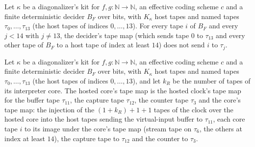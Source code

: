 \begin{theorem}
\label{Turing.NTimeDiag.DzKit.bB_ne}
\leanok
{}
Let $\kappa$ be a diagonalizer's kit for $f, g : \mathbb{N} \to \mathbb{N}$, an effective coding scheme $c$ and a finite deterministic decider $B_F$ over bits, with $K_\kappa$ host tapes and named tapes $\tau_0, \dots, \tau_{13}$ (the host tapes of indices $0, \dots, 13$). For every tape $i$ of $B_F$ and every $j < 14$ with $j \ne 13$, the decider's tape map (which sends tape $0$ to $\tau_{13}$ and every other tape of $B_F$ to a host tape of index at least $14$) does not send $i$ to $\tau_j$.
\end{theorem}

\begin{definition}
\label{Turing.NTimeDiag.DzKit.sR}
\leanok
{}
Let $\kappa$ be a diagonalizer's kit for $f, g : \mathbb{N} \to \mathbb{N}$, an effective coding scheme $c$ and a finite deterministic decider $B_F$ over bits, with $K_\kappa$ host tapes and named tapes $\tau_0, \dots, \tau_{13}$ (the host tapes of indices $0, \dots, 13$), and let $k_R$ be the number of tapes of its interpreter core. The hosted core's tape map is the hosted clock's tape map for the buffer tape $\tau_{11}$, the capture tape $\tau_{12}$, the counter tape $\tau_3$ and the core's tape map: the injection of the $(1 + k_R) + 1 + 1$ tapes of the clock over the hosted core into the host tapes sending the virtual-input buffer to $\tau_{11}$, each core tape $i$ to its image under the core's tape map (stream tape on $\tau_6$, the others at index at least $14$), the capture tape to $\tau_{12}$ and the counter to $\tau_3$.
\end{definition}

